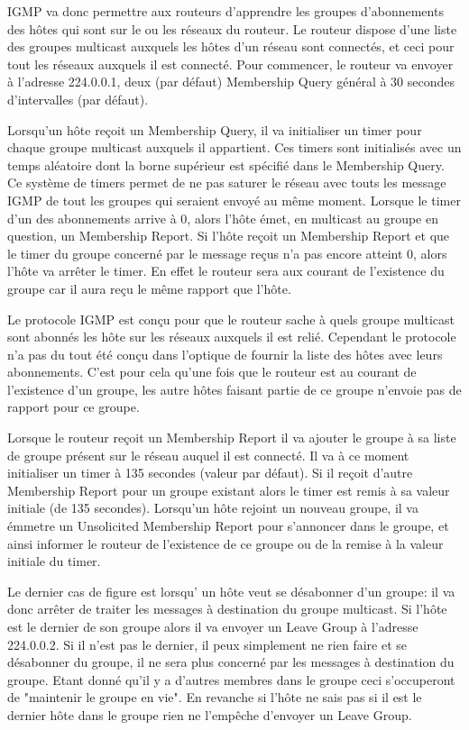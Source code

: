 \smallbreak
IGMP va donc permettre aux routeurs d'apprendre les groupes d'abonnements des
hôtes qui sont sur le ou les réseaux du routeur. Le routeur dispose d'une liste
des groupes multicast auxquels les hôtes d'un réseau sont connectés, et ceci
pour tout les réseaux auxquels il est connecté.  Pour commencer, le routeur va
envoyer à l'adresse 224.0.0.1, deux (par défaut) Membership Query général à 30
secondes d'intervalles (par défaut).

\smallbreak
Lorsqu'un hôte reçoit un Membership Query, il va initialiser un timer pour
chaque groupe multicast auxquels il appartient. Ces timers sont initialisés
avec un temps aléatoire dont la borne supérieur est spécifié dans le Membership
Query. Ce système de timers permet de ne pas saturer le réseau avec touts les
message IGMP de tout les groupes qui seraient envoyé au même moment.  Lorsque
le timer d'un des abonnements arrive à 0, alors l'hôte émet, en multicast au
groupe en question, un Membership Report.  Si l'hôte reçoit un Membership
Report et que le timer du groupe concerné par le message reçus n'a pas encore
atteint 0, alors l'hôte va arrêter le timer. En effet le routeur sera aux
courant de l'existence du groupe car il aura reçu le même rapport que l'hôte.

\smallbreak
Le protocole IGMP est conçu pour que le routeur sache à quels groupe multicast
sont abonnés les hôte sur les réseaux auxquels il est relié. Cependant le
protocole n'a pas du tout été conçu dans l'optique de fournir la liste des
hôtes avec leurs abonnements.  C'est pour cela qu'une fois que le routeur est
au courant de l'existence d'un groupe, les autre hôtes faisant partie de ce
groupe n'envoie pas de rapport pour ce groupe.

\smallbreak
Lorsque le routeur reçoit un Membership Report il va ajouter le groupe à sa
liste de groupe présent sur le réseau auquel il est connecté. Il va à ce moment
initialiser un timer à 135 secondes (valeur par défaut).  Si il reçoit d'autre
Membership Report pour un groupe existant alors le timer est remis à sa valeur
initiale (de 135 secondes).  Lorsqu'un hôte rejoint un nouveau groupe, il va
émmetre un Unsolicited Membership Report pour s'annoncer dans le groupe, et
ainsi informer le routeur de l'existence de ce groupe ou de la remise à la
valeur initiale du timer.

\smallbreak
Le dernier cas de figure est lorsqu' un hôte veut se désabonner d'un groupe: il
va donc arrêter de traiter les messages à destination du groupe multicast. Si
l'hôte est le dernier de son groupe alors il va envoyer un Leave Group à
l'adresse 224.0.0.2.  Si il n'est pas le dernier, il peux simplement ne rien
faire et se désabonner du groupe, il ne sera plus concerné par les messages à
destination du groupe. Etant donné qu'il y a d'autres membres dans le groupe
ceci s'occuperont de "maintenir le groupe en vie".  En revanche si l'hôte ne
sais pas si il est le dernier hôte dans le groupe rien ne l'empêche d'envoyer
un Leave Group.

